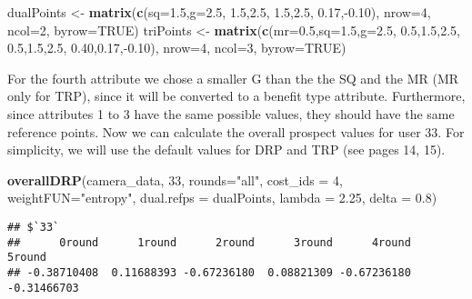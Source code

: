 \documentclass[]{article}
\newenvironment{Shaded}{\begin{snugshade}}{\end{snugshade}}
\newcommand{\KeywordTok}[1]{\textcolor[rgb]{0.13,0.29,0.53}{\textbf{{#1}}}}
\newcommand{\DataTypeTok}[1]{\textcolor[rgb]{0.13,0.29,0.53}{{#1}}}
\newcommand{\DecValTok}[1]{\textcolor[rgb]{0.00,0.00,0.81}{{#1}}}
\newcommand{\FloatTok}[1]{\textcolor[rgb]{0.00,0.00,0.81}{{#1}}}
\newcommand{\StringTok}[1]{\textcolor[rgb]{0.31,0.60,0.02}{{#1}}}
\newcommand{\OtherTok}[1]{\textcolor[rgb]{0.56,0.35,0.01}{{#1}}}
\newcommand{\NormalTok}[1]{{#1}}
\begin{document}
\begin{Shaded}
\begin{Highlighting}[]
\NormalTok{dualPoints <-}\StringTok{ }\KeywordTok{matrix}\NormalTok{(}\KeywordTok{c}\NormalTok{(}\DataTypeTok{sq=}\FloatTok{1.5}\NormalTok{,}\DataTypeTok{g=}\FloatTok{2.5}\NormalTok{,  }\FloatTok{1.5}\NormalTok{,}\FloatTok{2.5}\NormalTok{,  }\FloatTok{1.5}\NormalTok{,}\FloatTok{2.5}\NormalTok{,  }\FloatTok{0.17}\NormalTok{,-}\FloatTok{0.10}\NormalTok{),}
                     \DataTypeTok{nrow=}\DecValTok{4}\NormalTok{, }\DataTypeTok{ncol=}\DecValTok{2}\NormalTok{, }\DataTypeTok{byrow=}\OtherTok{TRUE}\NormalTok{)}
\NormalTok{triPoints <-}\StringTok{  }\KeywordTok{matrix}\NormalTok{(}\KeywordTok{c}\NormalTok{(}\DataTypeTok{mr=}\FloatTok{0.5}\NormalTok{,}\DataTypeTok{sq=}\FloatTok{1.5}\NormalTok{,}\DataTypeTok{g=}\FloatTok{2.5}\NormalTok{,  }\FloatTok{0.5}\NormalTok{,}\FloatTok{1.5}\NormalTok{,}\FloatTok{2.5}\NormalTok{,  }\FloatTok{0.5}\NormalTok{,}\FloatTok{1.5}\NormalTok{,}\FloatTok{2.5}\NormalTok{,  }
                       \FloatTok{0.40}\NormalTok{,}\FloatTok{0.17}\NormalTok{,-}\FloatTok{0.10}\NormalTok{), }\DataTypeTok{nrow=}\DecValTok{4}\NormalTok{, }\DataTypeTok{ncol=}\DecValTok{3}\NormalTok{, }\DataTypeTok{byrow=}\OtherTok{TRUE}\NormalTok{)}
\end{Highlighting}
\end{Shaded}

For the fourth attribute we chose a smaller G than the the SQ and the MR
(MR only for TRP), since it will be converted to a benefit type
attribute. Furthermore, since attributes 1 to 3 have the same possible
values, they should have the same reference points. Now we can calculate
the overall prospect values for user 33. For simplicity, we will use the
default values for DRP and TRP (see pages 14, 15).

\begin{Shaded}
\begin{Highlighting}[]
\KeywordTok{overallDRP}\NormalTok{(camera_data, }\DecValTok{33}\NormalTok{, }\DataTypeTok{rounds=}\StringTok{"all"}\NormalTok{, }\DataTypeTok{cost_ids =} \DecValTok{4}\NormalTok{, }\DataTypeTok{weightFUN=}\StringTok{"entropy"}\NormalTok{,}
           \DataTypeTok{dual.refps =} \NormalTok{dualPoints, }\DataTypeTok{lambda =} \FloatTok{2.25}\NormalTok{, }\DataTypeTok{delta =} \FloatTok{0.8}\NormalTok{)}
\end{Highlighting}
\end{Shaded}

\begin{verbatim}
## $`33`
##      0round      1round      2round      3round      4round      5round 
## -0.38710408  0.11688393 -0.67236180  0.08821309 -0.67236180 -0.31466703
\end{verbatim}
\end{document}
